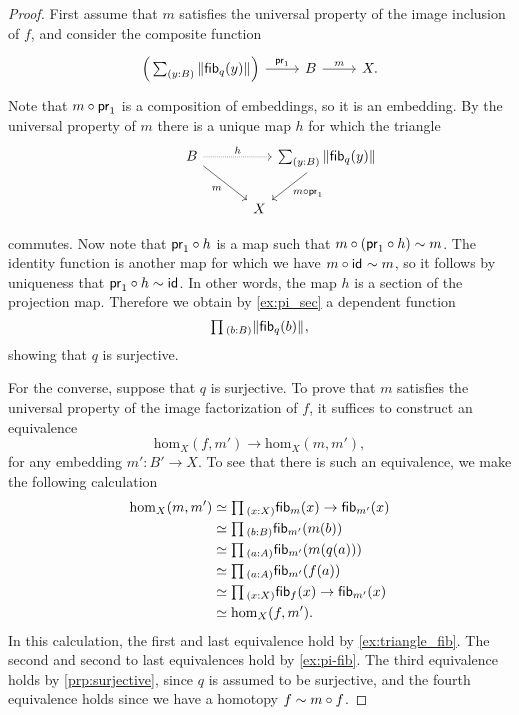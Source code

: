 \begin{proof}
  First assume that $m$ satisfies the universal property of the image inclusion of $f$, and consider the composite function
  \begin{equation*}
    \begin{tikzcd}
      \Big(\sm{y:B}\brck{\fib{q}{y}}\Big) \arrow[r,"\proj 1"] & B \arrow[r,"m"] & X.
    \end{tikzcd}
  \end{equation*}
  Note that $m\circ\mathsf{pr}_{1}$ is a composition of embeddings, so it is an embedding. By the universal property of $m$ there is a unique map $h$ for which the triangle
  \begin{equation*}
    \begin{tikzcd}[column sep=0]
      B \arrow[dr,swap,"m"] \arrow[rr,densely dotted,"h"] & & \sm{y:B}\brck{\fib{q}{y}} \arrow[dl,"m\circ\proj 1"] \\
      \phantom{\sm{y:B}\brck{\fib{q}{y}}} & X
    \end{tikzcd}
  \end{equation*}
  commutes. Now note that $\mathsf{pr}_{1}\circ h$ is a map such that $m\circ (\mathsf{pr}_{1}\circ h)\sim m$. The identity function is another map for which we have $m\circ\mathsf{id}_{}\sim m$, so it follows by uniqueness that $\mathsf{pr}_{1}\circ h\sim \mathsf{id}_{}$. In other words, the map $h$ is a section of the projection map. Therefore we obtain by \cref{ex:pi_sec} a dependent function
  \begin{equation*}
    \prd{b:B}\brck{\fib{q}{b}},
  \end{equation*}
  showing that $q$ is surjective.

  For the converse, suppose that $q$ is surjective. To prove that $m$ satisfies the universal property of the image factorization of $f$, it suffices to construct an equivalence
  \begin{equation*}
    \mathrm{hom}_X(f,m')\to\mathrm{hom}_X(m,m'),
  \end{equation*}
  for any embedding $m':B'\to X$. To see that there is such an equivalence, we make the following calculation
  \begin{align*}
    \mathrm{hom}_X(m,m') & \simeq \prd{x:X}\fib{m}{x}\to\fib{m'}{x} \\
                         & \simeq \prd{b:B}\fib{m'}{m(b)} \\
                         & \simeq \prd{a:A}\fib{m'}{m(q(a))} \\
                         & \simeq \prd{a:A}\fib{m'}{f(a)} \\
                         & \simeq \prd{x:X}\fib{f}{x}\to\fib{m'}{x} \\
                         & \simeq \mathrm{hom}_X(f,m').
  \end{align*}
  In this calculation, the first and last equivalence hold by \cref{ex:triangle_fib}. The second and second to last equivalences hold by \cref{ex:pi-fib}. The third equivalence holds by \cref{prp:surjective}, since $q$ is assumed to be surjective, and the fourth equivalence holds since we have a homotopy $f\sim m\circ f$.
\end{proof}

